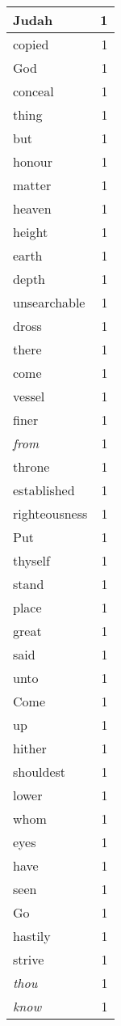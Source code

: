 \begin{center}
\begin{longtable}{l|r}
Judah & 1\\ \hline 
copied & 1\\ \hline 
God & 1\\ \hline 
conceal & 1\\ \hline 
thing & 1\\ \hline 
but & 1\\ \hline 
honour & 1\\ \hline 
matter & 1\\ \hline 
heaven & 1\\ \hline 
height & 1\\ \hline 
earth & 1\\ \hline 
depth & 1\\ \hline 
unsearchable & 1\\ \hline 
dross & 1\\ \hline 
there & 1\\ \hline 
come & 1\\ \hline 
vessel & 1\\ \hline 
finer & 1\\ \hline 
\emph{from} & 1\\ \hline 
throne & 1\\ \hline 
established & 1\\ \hline 
righteousness & 1\\ \hline 
Put & 1\\ \hline 
thyself & 1\\ \hline 
stand & 1\\ \hline 
place & 1\\ \hline 
great & 1\\ \hline 
said & 1\\ \hline 
unto & 1\\ \hline 
Come & 1\\ \hline 
up & 1\\ \hline 
hither & 1\\ \hline 
shouldest & 1\\ \hline 
lower & 1\\ \hline 
whom & 1\\ \hline 
eyes & 1\\ \hline 
have & 1\\ \hline 
seen & 1\\ \hline 
Go & 1\\ \hline 
hastily & 1\\ \hline 
strive & 1\\ \hline 
\emph{thou} & 1\\ \hline 
\emph{know} & 1\\ \hline 

\end{longtable}
\end{center}
